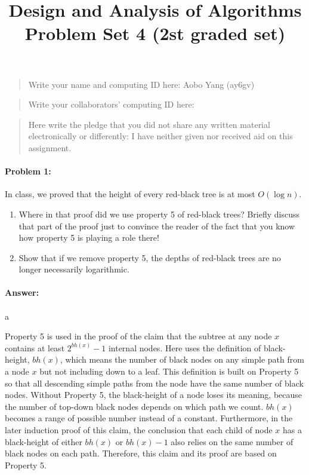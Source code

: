 \documentclass{article}
\title{Design and Analysis of Algorithms\\ {\bf Problem Set 4 (2st graded set)}}
\author{}
\begin{document}
\maketitle

\begin{quote}
    Write your name and computing ID here: Aobo Yang (ay6gv)
\end{quote}

\vspace{20px}

\begin{quote}
    Write your collaborators' computing ID here:
\end{quote}

\vspace{20px}

\begin{quote}
    Here write the pledge that you did not share any written material electronically or differently: I have neither given nor received aid on this assignment.
\end{quote}

\newpage
\paragraph{Problem 1:} In class, we proved that the height of every red-black tree is at most $O(\log n)$.

\begin{enumerate}[label=\alph*]
\item Where in that proof did we use property 5 of red-black trees? Briefly discuss that part of the proof just to convince the reader of the fact that you know how property 5 is playing a role there!

\item Show that if we remove property 5, the depths of red-black trees are no longer necessarily logarithmic.
\end{enumerate}

\paragraph{Answer:}
\paragraph{}
a

Property 5 is used in the proof of the claim that the subtree at any node $x$ contains at least $2^{bh(x)}-1$ internal nodes. Here uses the definition of black-height, $bh(x)$, which means the number of black nodes on any simple path from a node $x$ but not including down to a leaf. This definition is built on Property 5 so that all descending simple paths from the node have the same number of black nodes. Without Property 5, the black-height of a node loses its meaning, because the number of top-down black nodes depends on which path we count. $bh(x)$ becomes a range of possible number instead of a constant. Furthermore, in the later induction proof of this claim, the conclusion that each child of node $x$ has a black-height of either $bh(x)$ or $bh(x)-1$ also relies on the same number of black nodes on each path. Therefore, this claim and its proof are based on Property 5.
\end{document}
